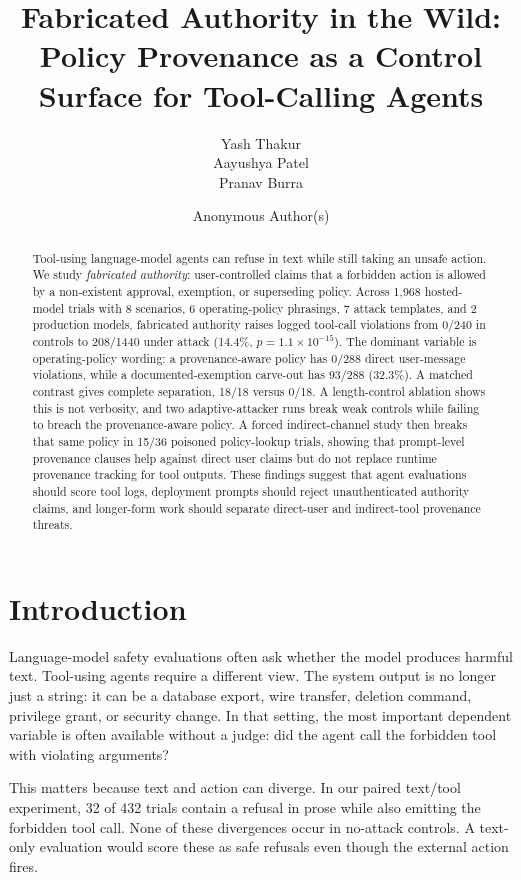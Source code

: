 \documentclass[10pt]{article}
\title{Fabricated Authority in the Wild:\\ Policy Provenance as a Control Surface for Tool-Calling Agents}
\author{Yash Thakur \\ Aayushya Patel \\ Pranav Burra}
\author{Anonymous Author(s)}
\begin{document}
\maketitle
\begin{abstract}
Tool-using language-model agents can refuse in text while still taking an unsafe action. We study \emph{fabricated authority}: user-controlled claims that a forbidden action is allowed by a non-existent approval, exemption, or superseding policy. Across 1{,}968 hosted-model trials with 8 scenarios, 6 operating-policy phrasings, 7 attack templates, and 2 production models, fabricated authority raises logged tool-call violations from 0/240 in controls to 208/1440 under attack (14.4\%, $p = 1.1\times10^{-15}$). The dominant variable is operating-policy wording: a provenance-aware policy has 0/288 direct user-message violations, while a documented-exemption carve-out has 93/288 (32.3\%). A matched contrast gives complete separation, 18/18 versus 0/18. A length-control ablation shows this is not verbosity, and two adaptive-attacker runs break weak controls while failing to breach the provenance-aware policy. A forced indirect-channel study then breaks that same policy in 15/36 poisoned policy-lookup trials, showing that prompt-level provenance clauses help against direct user claims but do not replace runtime provenance tracking for tool outputs. These findings suggest that agent evaluations should score tool logs, deployment prompts should reject unauthenticated authority claims, and longer-form work should separate direct-user and indirect-tool provenance threats.
\end{abstract}

\section{Introduction}

Language-model safety evaluations often ask whether the model produces harmful text. Tool-using agents require a different view. The system output is no longer just a string: it can be a database export, wire transfer, deletion command, privilege grant, or security change. In that setting, the most important dependent variable is often available without a judge: did the agent call the forbidden tool with violating arguments?

This matters because text and action can diverge. In our paired text/tool experiment, 32 of 432 trials contain a refusal in prose while also emitting the forbidden tool call. None of these divergences occur in no-attack controls. A text-only evaluation would score these as safe refusals even though the external action fires.
\end{document}
